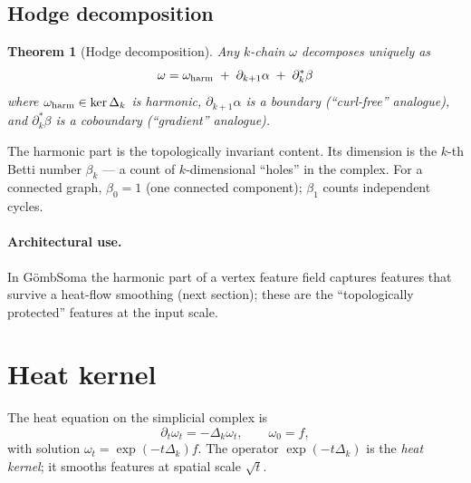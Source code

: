 \documentclass[11pt,a4paper]{article}
\newtheorem{theorem}{Theorem}[section]
\begin{document}
\subsection{Hodge decomposition}

\begin{theorem}[Hodge decomposition]
Any $k$-chain $\omega$ decomposes uniquely as
\[
\omega = \omega_{\rm harm} \;+\; \partial_{k+1} \alpha \;+\; \partial_k^* \beta
\]
where $\omega_{\rm harm} \in \ker \Delta_k$ is \emph{harmonic},
$\partial_{k+1} \alpha$ is a \emph{boundary} (``curl-free'' analogue),
and $\partial_k^* \beta$ is a \emph{coboundary}
(``gradient'' analogue).
\end{theorem}

The harmonic part is the topologically invariant content. Its
dimension is the $k$-th Betti number $\beta_k$ --- a count of
$k$-dimensional ``holes'' in the complex. For a connected graph,
$\beta_0 = 1$ (one connected component); $\beta_1$ counts independent
cycles.

\paragraph{Architectural use.} In G\"ombSoma the harmonic part of a
vertex feature field captures features that survive a heat-flow
smoothing (next section); these are the ``topologically protected''
features at the input scale.

\section{Heat kernel}

The heat equation on the simplicial complex is
\[
\partial_t \omega_t = -\Delta_k \omega_t,
\qquad \omega_0 = f,
\]
with solution $\omega_t = \exp(-t \Delta_k) f$. The operator
$\exp(-t \Delta_k)$ is the \emph{heat kernel}; it smooths features at
spatial scale $\sqrt{t}$.

\begin{center}
\end{center}
\end{document}
